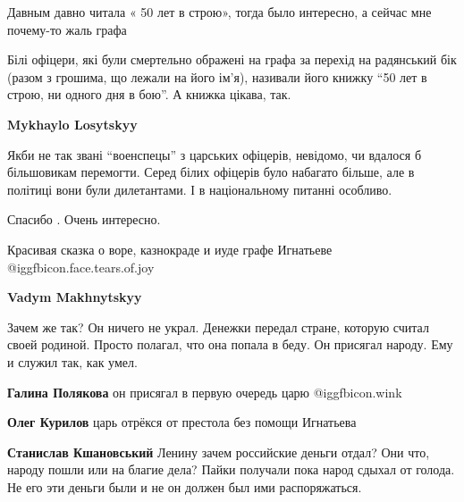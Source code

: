  
 
 
 
 
\zzSecCmt

\begin{itemize} %
Давным давно читала « 50 лет в строю», тогда было интересно, а сейчас мне почему-то жаль графа


Білі офіцери, які були смертельно ображені на графа за перехід на радянський
бік (разом з грошима, що лежали на його ім'я), називали його книжку \enquote{50 лет в
строю, ни одного дня в бою}. А книжка цікава, так.

\begin{itemize} %
\textbf{Mykhaylo Losytskyy} 

Якби не так звані \enquote{военспецы} з царських офіцерів, невідомо, чи вдалося
б більшовикам перемогти. Серед білих офіцерів було набагато більше, але в
політиці вони були дилетантами. І в національному питанні особливо.

\end{itemize} %

Спасибо . Очень интересно.

Красивая сказка о воре, казнокраде и иуде графе Игнатьеве  @igg{fbicon.face.tears.of.joy} 

\begin{itemize} %
\textbf{Vadym Makhnytskyy} 

Зачем же так? Он ничего не украл. Денежки передал стране, которую считал своей
родиной. Просто полагал, что она попала в беду. Он присягал народу. Ему и
служил так, как умел.

\begin{itemize} %
\textbf{Галина Полякова} он присягал в первую очередь царю  @igg{fbicon.wink} 

\textbf{Олег Курилов} царь отрёкся от престола без помощи Игнатьева

\textbf{Станислав Кшановський}
Ленину зачем российские деньги отдал?
Они что, народу пошли или на благие дела?
Пайки получали пока народ сдыхал от голода.
Не его эти деньги были и не он должен был ими распоряжаться.


\end{itemize}
\end{itemize}
\end{itemize}
